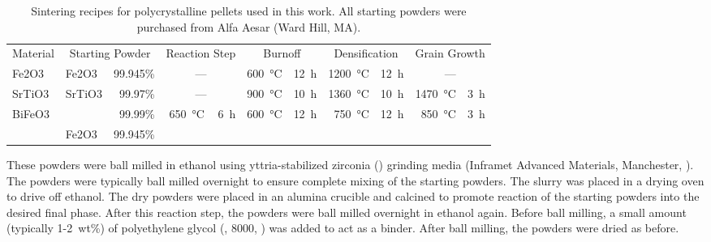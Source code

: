 \documentclass[12pt,%
              twoside,
               letterpaper]{uiothesis}
\begin{document}
\begin{table} 

	\begin{center}
	\footnotesize
	\begin{tabular}{llrrrrrrrrr}


		\multicolumn{1}{c}{Material}&
		\multicolumn{2}{c}{Starting Powder} &  
		\multicolumn{2}{c}{Reaction Step} &  
		\multicolumn{2}{c}{Burnoff} &  
		\multicolumn{2}{c}{Densification} &  
		\multicolumn{2}{c}{Grain Growth}  \\	

		\cmidrule(lr){1-1}
		\cmidrule(lr){2-3}
		\cmidrule(lr){4-5}
		\cmidrule(lr){6-7}
		\cmidrule(lr){8-9}
		\cmidrule(lr){10-11}
		
   		Fe2O3 &
		Fe2O3 &
	 	99.945\% &
		\multicolumn{2}{c}{---} &
		\SI{600}{\degreeCelsius} &
		\SI{12}{\hour}  &
		\SI{1200}{\degreeCelsius} &
		\SI{12}{\hour}  &
		\multicolumn{2}{c}{---} \\[9pt]

   		SrTiO3 &
		SrTiO3 &
	 	99.97\% &
		\multicolumn{2}{c}{---} &
		\SI{900}{\degreeCelsius} &
		\SI{10}{\hour}  &
		\SI{1360}{\degreeCelsius} &
		\SI{10}{\hour}  &
		\SI{1470}{\degreeCelsius} &
		\SI{3}{\hour}\\[9pt]
				

   		BiFeO3 &
		\ce{Bi2O3} &
	 	99.99\% &
		\SI{650}{\degreeCelsius} &
		\SI{6}{\hour}  &
		\SI{600}{\degreeCelsius} &
		\SI{12}{\hour}  &
		\SI{750}{\degreeCelsius} &
		\SI{12}{\hour}  &
		\SI{850}{\degreeCelsius} &
		\SI{3}{\hour}\\
		
		&
		Fe2O3&
		99.945\%&
		&
		&
		&
		&
		&
		&
		&
		\\
		
	\end{tabular}
	\end{center}
   	\caption[Sintering recipes for polycrystalline pellets]{%
   		Sintering recipes for polycrystalline pellets used in this work. All starting
powders were purchased from Alfa Aesar (Ward Hill, MA).}
   	\label{tab:sinteringrecipe}

\end{table}
These powders were ball milled in ethanol using yttria-stabilized zirconia ()
grinding media (Inframet Advanced Materials, Manchester, ). The powders were
typically ball milled overnight to ensure complete mixing of the starting powders. The
slurry was placed in a drying oven to drive off ethanol. The dry powders were placed in an
alumina crucible and calcined to promote reaction of the starting powders into the desired
final phase. After this reaction step, the powders were ball milled overnight in ethanol
again. Before ball milling, a small amount (typically 1-2~wt\%) of polyethylene glycol
(, 8000, ) was added to act as a binder.  After ball milling, the
powders were dried as before. %
\end{document}
